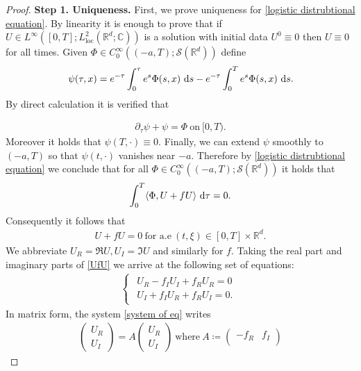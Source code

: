 \documentclass[11pt,reqno]{amsart}
\numberwithin{equation}{section}
\def\dd{{\rm d}}
\begin{document}
\begin{proof}
\textbf{Step 1. Uniqueness.} First, we prove uniqueness for \eqref{logistic distrubtional equation}. By linearity it is enough to prove that if $U\in L^{\infty}([0,T];L^{2}_{\mathrm{loc}}(\mathbb{R}^{d};\mathbb{C}))$ is a solution with initial data $U^{0}\equiv 0$ then $U\equiv 0$ for all times. Given $\Phi\in C^{\infty}_{0}((-a,T);\mathcal{S}(\mathbb{R}^{d}))$ define  
\begin{align*}
\psi(\tau,x)=e^{-\tau}\int^{\tau}_{0}e^{s}\Phi(s,x)\ \dd s-e^{-\tau}\int_{0}^{T}e^{s}\Phi(s,x)\ \dd s.    
\end{align*}
By direct calculation it is verified  that 

\begin{align*}
\partial_{\tau}\psi+\psi=\Phi \ \mbox{on}\ [0,T).    
\end{align*}
Moreover it holds that $\psi(T,\cdot)\equiv 0.$ Finally, we can extend $\psi$ smoothly to $(-a,T)$ so that $\psi(t,\cdot)$ vanishes near $-a$.    
Therefore by \eqref{logistic distrubtional equation} we conclude that for all $\Phi\in C^{\infty}_{0}((-a,T);\mathcal{S}(\mathbb{R}^{d}))$ it holds that 
\begin{align*}
\int_{0}^{T}\langle \Phi,U+fU \rangle\ \dd \tau=0.     
\end{align*}
Consequently it follows that  
\begin{align}
U+fU=0 \ \mbox{for  a.e}\ (t,\xi)\in [0,T]\times \mathbb{R}^{d}.  \label{UfU}  
\end{align}
We abbreviate $U_{R}=\Re U, U_{I}=\Im U$ and similarly for $f$. Taking the real part and imaginary parts of \eqref{UfU} we arrive at the following set of equations: 
\begin{align}
\begin{cases}
\begin{array}{lc}
U_{R}-f_{I}U_{I}+f_{R}U_{R}=0\\
U_{I}+f_{I}U_{R}+f_{R}U_{I}=0. \end{array}\end{cases} \label{system of eq}
\end{align}
In matrix form, the system \eqref{system of eq} writes 
\begin{align*}
\begin{pmatrix}U_{R}\\
U_{I}
\end{pmatrix}=A\begin{pmatrix}U_{R}\\
U_{I}
\end{pmatrix}\ \mbox{where}\ A\coloneqq\begin{pmatrix}-f_{R} & f_{I}\\

\end{pmatrix}
\end{align*}
\end{proof}
\end{document}
